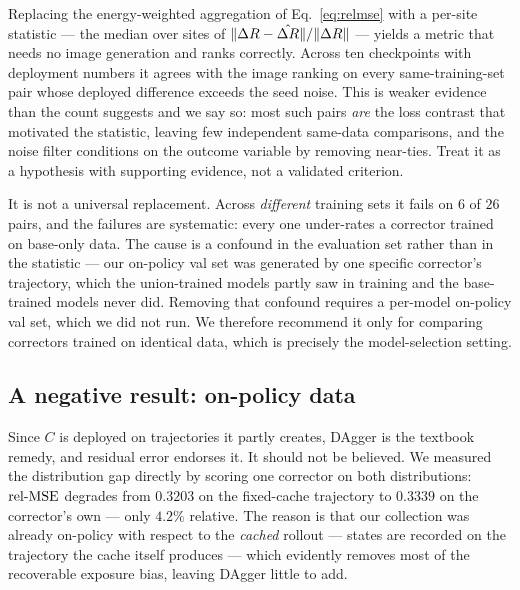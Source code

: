 Replacing the energy-weighted aggregation of Eq.~\ref{eq:relmse} with a per-site
statistic --- the median over sites of $\lVert \Delta R - \hat{\Delta R}\rVert / \lVert \Delta R \rVert$
--- yields a metric that needs no image generation and ranks correctly. Across ten
checkpoints with deployment numbers it agrees with the image ranking on every
same-training-set pair whose deployed difference exceeds the seed noise. This is
weaker evidence than the count suggests and we say so: most such pairs \emph{are} the
loss contrast that motivated the statistic, leaving few independent same-data
comparisons, and the noise filter conditions on the outcome variable by removing
near-ties. Treat it as a hypothesis with supporting evidence, not a validated
criterion.

It is not a universal replacement. Across \emph{different} training sets it fails on
$6$ of $26$ pairs, and the failures are systematic: every one under-rates a
corrector trained on base-only data. The cause is a confound in the evaluation set
rather than in the statistic --- our on-policy val set was generated by one specific
corrector's trajectory, which the union-trained models partly saw in training and the
base-trained models never did. Removing that confound requires a per-model on-policy
val set, which we did not run. We therefore recommend it only for comparing
correctors trained on identical data, which is precisely the model-selection setting.

\subsection{A negative result: on-policy data}
\label{sec:dagger}

Since $C$ is deployed on trajectories it partly creates, DAgger
\cite{ross2011dagger} is the textbook remedy, and residual error endorses it. It
should not be believed. We measured the distribution gap directly by scoring one
corrector on both distributions: $\mathrm{rel\text{-}MSE}$ degrades from $0.3203$ on the
fixed-cache trajectory to $0.3339$ on the corrector's own --- only $4.2\%$
relative. The reason is that our collection was
already on-policy with respect to the \emph{cached} rollout --- states are recorded
on the trajectory the cache itself produces --- which evidently removes most of the
recoverable exposure bias, leaving DAgger little to add.

